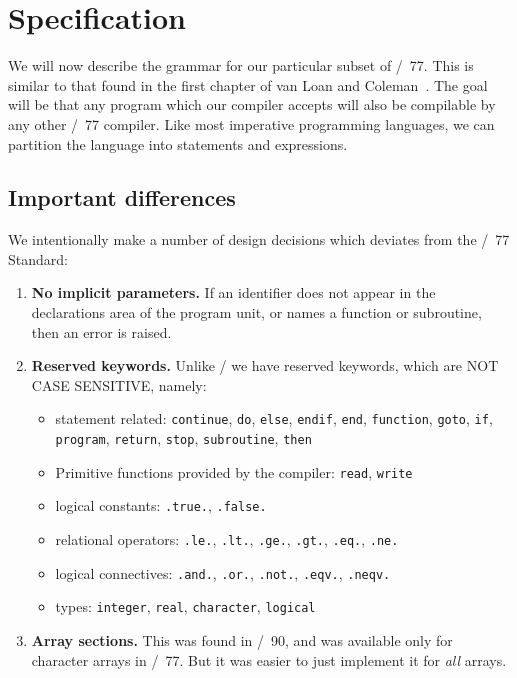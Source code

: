 \section{Specification}
We will now describe the grammar for our particular subset of \FORTRAN/~77.
This is similar to that found in the first chapter of van Loan and
Coleman~\cite{vanloan1987handbook}. The goal will be that any program
which our compiler accepts will also be compilable by any other \FORTRAN/~77 compiler.
Like most imperative programming languages, we can partition the
language into statements and expressions.

\subsection{Important differences}
We intentionally make a number of design decisions which deviates from
the \FORTRAN/~77 Standard:
\begin{enumerate}
\item\textbf{No implicit parameters.} If an identifier does not appear
  in the declarations area of the program unit, or names a function or
  subroutine, then an error is raised.
\item \textbf{Reserved keywords.} Unlike \FORTRAN/ we have reserved
  keywords, which are NOT CASE SENSITIVE, namely:
  \begin{itemize}
  \item statement related: \texttt{continue}, \texttt{do}, \texttt{else}, \texttt{endif}, \texttt{end}, \texttt{function}, \texttt{goto}, \texttt{if}, \texttt{program}, \texttt{return}, \texttt{stop}, \texttt{subroutine}, \texttt{then}
  \item Primitive functions provided by the compiler: \texttt{read}, \texttt{write}
  \item logical constants: \texttt{.true.}, \texttt{.false.}
  \item relational operators: \texttt{.le.}, \texttt{.lt.}, \texttt{.ge.}, \texttt{.gt.}, \texttt{.eq.}, \texttt{.ne.}
  \item logical connectives: \texttt{.and.}, \texttt{.or.}, \texttt{.not.}, \texttt{.eqv.}, \texttt{.neqv.}
  \item types: \texttt{integer}, \texttt{real}, \texttt{character}, \texttt{logical}
  \end{itemize}
\item\textbf{Array sections.} This was found in \FORTRAN/~90, and was
  available only for character arrays in \FORTRAN/~77. But it was easier
  to just implement it for \emph{all} arrays.
\end{enumerate}

